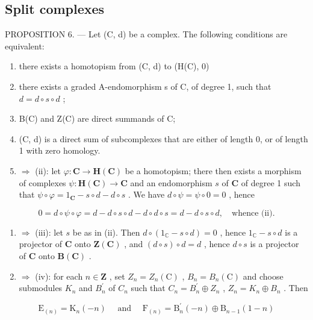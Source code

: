 \subsection{Split complexes}

PROPOSITION 6. — Let (C, d) be a complex. The following conditions are equivalent:

\begin{enumerate}
\def\labelenumi{(\roman{enumi})}
\item
  there exists a homotopism from (C, d) to (H(C), 0)
\item
  there exists a graded A-endomorphism s of C, of degree 1, such that \(d = d \circ s \circ d\) ;
\item
  B(C) and Z(C) are direct summands of C;
\item
  (C, d) is a direct sum of subcomplexes that are either of length 0, or of length 1 with zero homology.
\item
  \(\Rightarrow\) (ii): let \(\varphi: \mathbf{C} \to \mathbf{H}(\mathbf{C})\) be a homotopism; there then exists a morphism of complexes \(\psi: \mathbf{H}(\mathbf{C}) \to \mathbf{C}\) and an endomorphism \(s\) of \(\mathbf{C}\) of degree 1 such that \(\psi \circ \varphi = 1_{\mathbf{C}} - s \circ d - d \circ s\) . We have \(d \circ \psi = \psi \circ 0 = 0\) , hence
\end{enumerate}

\[
0 = d \circ \psi \circ \varphi = d - d \circ s \circ d - d \circ d \circ s = d - d \circ s \circ d, \quad \text {whence (ii)}.
\]

\begin{enumerate}
\def\labelenumi{(\roman{enumi})}
\setcounter{enumi}{1}
\item
  \(\Rightarrow\) (iii): let \(s\) be as in (ii). Then \(d \circ (1_{\mathbb{C}} - s \circ d) = 0\) , hence \(1_{\mathbb{C}} - s \circ d\) is a projector of \(\mathbf{C}\) onto \(\mathbf{Z}(\mathbf{C})\) , and \((d \circ s) \circ d = d\) , hence \(d \circ s\) is a projector of \(\mathbf{C}\) onto \(\mathbf{B}(\mathbf{C})\) .
\item
  \(\Rightarrow\) (iv): for each \(n\in\mathbf{Z}\) , set \(Z_{n}=Z_{n}(\mathrm{C})\) , \(B_{n}=B_{n}(\mathrm{C})\) and choose submodules \(K_{n}\) and \(B_{n}^{\prime}\) of \(C_{n}\) such that \(C_{n}=B_{n}^{\prime}\oplus Z_{n}\) , \(Z_{n}=K_{n}\oplus B_{n}\) . Then
\end{enumerate}

\[
\mathrm{E} _ {(n)} = \mathrm{K} _ {n} (- n) \quad \text { and } \quad \mathrm{F} _ {(n)} = \mathrm{B} _ {n} ^ {\prime} (- n) \oplus \mathrm{B} _ {n - 1} (1 - n)
\]

